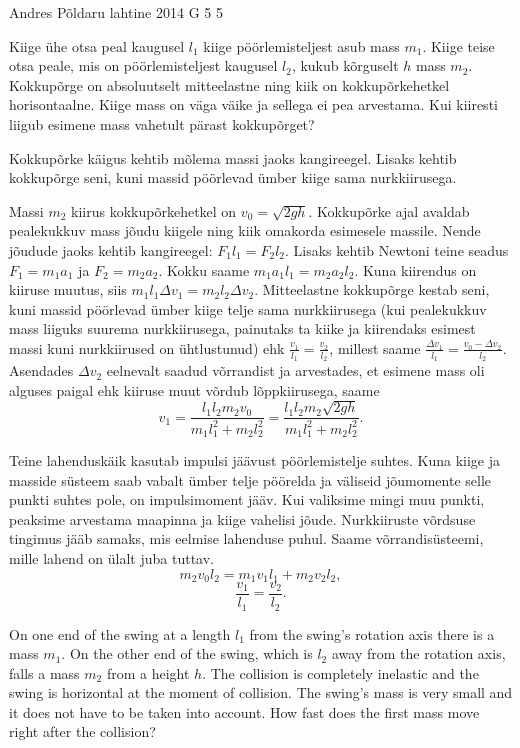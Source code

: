 {Andres Põldaru} %
{lahtine} %
{2014} %
{G 5} %
{5} %
{
\ifStatement
Kiige ühe otsa peal kaugusel $l_1$ kiige pöörlemisteljest asub mass $m_1$. Kiige teise otsa peale, mis on pöörlemisteljest kaugusel $l_2$, kukub kõrguselt $h$ mass $m_2$. Kokkupõrge on absoluutselt mitteelastne ning kiik on kokkupõrkehetkel horisontaalne. Kiige mass on väga väike ja sellega ei pea arvestama. Kui kiiresti liigub esimene mass vahetult pärast kokkupõrget?
\fi


\ifHint
Kokkupõrke käigus kehtib mõlema massi jaoks kangireegel. Lisaks kehtib kokkupõrge seni, kuni massid pöörlevad ümber kiige sama nurkkiirusega.
\fi


\ifSolution
Massi $m_2$ kiirus kokkupõrkehetkel on $v_0=\sqrt{2gh}$. Kokkupõrke ajal avaldab pealekukkuv mass jõudu kiigele ning kiik omakorda esimesele massile. Nende jõudude jaoks kehtib kangireegel: $F_1l_1=F_2l_2$. Lisaks kehtib Newtoni teine seadus $F_1=m_1a_1$ ja $F_2=m_2a_2$. Kokku saame $m_1a_1l_1=m_2a_2l_2$. Kuna kiirendus on kiiruse muutus, siis  $m_1l_1\Delta v_1=m_2l_2\Delta v_2$. Mitteelastne kokkupõrge kestab seni, kuni massid pöörlevad ümber kiige telje sama nurkkiirusega (kui pealekukkuv mass liiguks suurema nurkkiirusega, painutaks ta kiike ja kiirendaks esimest massi kuni nurkkiirused on ühtlustunud) ehk $\frac{v_1}{l_1}=\frac{v_2}{l_2}$, millest saame $\frac{\Delta v_1}{l_1}=\frac{v_0-\Delta v_2}{l_2}$. Asendades $\Delta v_2$ eelnevalt saadud võrrandist ja arvestades, et esimene mass oli alguses paigal ehk kiiruse muut võrdub lõppkiirusega, saame 
\[
v_1=\frac{l_1l_2m_2v_0}{m_1l_1^2+m_2l_2^2}=\frac{l_1l_2m_2\sqrt{2gh}}{m_1l_1^2+m_2l_2^2}.
\]

Teine lahenduskäik kasutab impulsi jäävust pöörlemistelje suhtes. Kuna kiige ja masside süsteem saab vabalt ümber telje pöörelda ja väliseid jõumomente selle punkti suhtes pole, on impulsimoment jääv. Kui valiksime mingi muu punkti, peaksime arvestama maapinna ja kiige vahelisi jõude. Nurkkiiruste võrdsuse tingimus jääb samaks, mis eelmise lahenduse puhul. Saame võrrandisüsteemi, mille lahend on ülalt juba tuttav.
\[
 m_2v_0l_2=m_1v_1l_1+m_2v_2l_2,
\]
\[
\frac{v_1}{l_1}=\frac{v_2}{l_2}.
\]
\fi


\ifEngStatement
On one end of the swing at a length $l_1$ from the swing’s rotation axis there is a mass $m_1$. On the other end of the swing, which is $l_2$ away from the rotation axis, falls a mass $m_2$ from a height $h$. The collision is completely inelastic and the swing is horizontal at the moment of collision. The swing’s mass is very small and it does not have to be taken into account. How fast does the first mass move right after the collision?
\fi


}
